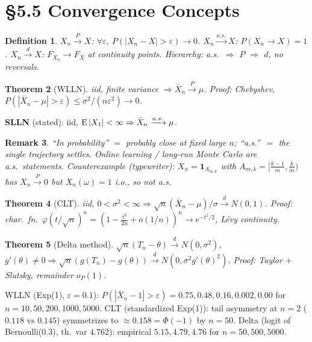 \documentclass[11pt]{article}
\newtheorem{theorem}{Theorem}[section]
\newtheorem{definition}[theorem]{Definition}
\newtheorem{remark}[theorem]{Remark}
\newcommand{\convP}{\xrightarrow{P}}\newcommand{\convD}{\xrightarrow{d}}\newcommand{\convAS}{\xrightarrow{a.s.}}
\begin{document}
\section{\S5.5 Convergence Concepts}
\begin{definition}
$X_n\convP X$: $\forall\varepsilon,\ P(|X_n-X|>\varepsilon)\to 0$. $X_n\convAS X$: $P(X_n\to X)=1$. $X_n\convD X$: $F_{X_n}\to F_X$ at continuity points. Hierarchy: a.s.\ $\Rightarrow$ $P$ $\Rightarrow$ $d$, no reversals.
\end{definition}
\begin{theorem}[WLLN]
iid, finite variance $\Rightarrow\bar X_n\convP\mu$. Proof: Chebyshev, $P(|\bar X_n-\mu|>\varepsilon)\le\sigma^2/(n\varepsilon^2)\to 0$.
\end{theorem}
\textbf{SLLN} (stated): iid, $\E|X_1|<\infty\Rightarrow\bar X_n\convAS\mu$.
\begin{remark}
``In probability'' $=$ probably close at fixed large $n$; ``a.s.''\ $=$ the single trajectory settles. Online learning / long-run Monte Carlo are a.s.\ statements. Counterexample (typewriter): $X_n=\mathbf 1_{A_{m,k}}$ with $A_{m,k}=[\frac{k-1}m,\frac km)$ has $X_n\convP 0$ but $X_n(\omega)=1$ i.o., so not a.s.
\end{remark}
\begin{theorem}[CLT]
iid, $0<\sigma^2<\infty\Rightarrow\sqrt n(\bar X_n-\mu)/\sigma\convD N(0,1)$. Proof: char.\ fn.\ $\varphi(t/\sqrt n)^n=(1-\frac{t^2}{2n}+o(1/n))^n\to e^{-t^2/2}$, L\'evy continuity.
\end{theorem}
\begin{theorem}[Delta method]
$\sqrt n(T_n-\theta)\convD N(0,\sigma^2)$, $g'(\theta)\ne 0\Rightarrow\sqrt n(g(T_n)-g(\theta))\convD N(0,\sigma^2 g'(\theta)^2)$. Proof: Taylor $+$ Slutsky, remainder $o_P(1)$.
\end{theorem}
\begin{simbox}
WLLN (Exp(1), $\varepsilon=0.1$): $P(|\bar X_n-1|>\varepsilon)=0.75,0.48,0.16,0.002,0.00$ for $n=10,50,200,1000,5000$. CLT (standardized Exp(1)): tail asymmetry at $n=2$ ($0.118$ vs $0.145$) symmetrizes to $\approx 0.158=\Phi(-1)$ by $n=50$. Delta (logit of Bernoulli(0.3), th.\ var $4.762$): empirical $5.15,4.79,4.76$ for $n=50,500,5000$.
\end{simbox}
\end{document}
